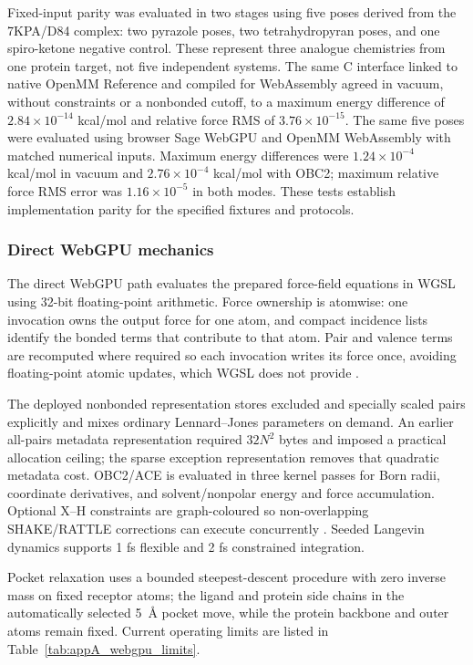 \documentclass[11pt]{article}
\begin{document}
\begin{small}
Fixed-input parity was evaluated in two stages using five poses derived from the 7KPA/D84 complex: two pyrazole poses, two tetrahydropyran poses, and one spiro-ketone negative control. These represent three analogue chemistries from one protein target, not five independent systems. The same C interface linked to native OpenMM Reference and compiled for WebAssembly agreed in vacuum, without constraints or a nonbonded cutoff, to a maximum energy difference of $2.84 \times 10^{-14}$ kcal/mol and relative force RMS of $3.76 \times 10^{-15}$. The same five poses were evaluated using browser Sage WebGPU and OpenMM WebAssembly with matched numerical inputs. Maximum energy differences were $1.24 \times 10^{-4}$ kcal/mol in vacuum and $2.76 \times 10^{-4}$ kcal/mol with OBC2; maximum relative force RMS error was $1.16 \times 10^{-5}$ in both modes. These tests establish implementation parity for the specified fixtures and protocols.

\subsubsection{Direct WebGPU mechanics}

The direct WebGPU path evaluates the prepared force-field equations in WGSL using 32-bit floating-point arithmetic. Force ownership is atomwise: one invocation owns the output force for one atom, and compact incidence lists identify the bonded terms that contribute to that atom. Pair and valence terms are recomputed where required so each invocation writes its force once, avoiding floating-point atomic updates, which WGSL does not provide \citep{webgpuWGSL2026}.

The deployed nonbonded representation stores excluded and specially scaled pairs explicitly and mixes ordinary Lennard--Jones parameters on demand. An earlier all-pairs metadata representation required $32N^2$ bytes and imposed a practical allocation ceiling; the sparse exception representation removes that quadratic metadata cost. OBC2/ACE is evaluated in three kernel passes for Born radii, coordinate derivatives, and solvent/nonpolar energy and force accumulation. Optional X--H constraints are graph-coloured so non-overlapping SHAKE/RATTLE corrections can execute concurrently \citep{ryckaert1977shake,andersen1983rattle}. Seeded Langevin dynamics supports 1 fs flexible and 2 fs constrained integration.

Pocket relaxation uses a bounded steepest-descent procedure with zero inverse mass on fixed receptor atoms; the ligand and protein side chains in the automatically selected 5~\AA{} pocket move, while the protein backbone and outer atoms remain fixed. Current operating limits are listed in Table~\ref{tab:appA_webgpu_limits}.


\end{small}
\end{document}
